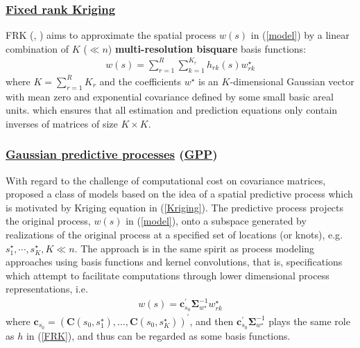 \documentclass[
12pt, %
a4paper, %
oneside, %
headinclude,footinclude, %
BCOR5mm, %
]{scrartcl}
\begin{document}
\subsubsection{\href{https://chenyw68.github.io/Literature/[2017]An R Package for Spatial and Spatio-Temporal Prediction with Large Datasets(FRK).pdf}{Fixed rank Kriging}}
FRK (\href{https://chenyw68.github.io/Literature/[2006]Spatial prediction for massive datasets.pdf}{\citep{cressie2006spatial}}, \href{https://chenyw68.github.io/Literature/[2008]Fixed rank kriging for very large spatial data sets.pdf}{\citep{cressie2008fixed}}) aims to approximate the spatial process $w(s)$ in (\ref{model}) by a linear combination of $K$ ($\ll n$) \textbf{multi-resolution bisquare} basis functions: \begin{equation}
\begin{aligned}
w(s) = \sum_{r = 1}^{R}\sum_{k = 1}^{K_r}h_{rk}(s)w_{rk}^{\star}
\end{aligned} \label{FRK}
\end{equation}
where $K = \sum_{r = 1}^{R}K_r$ and the coefficients $w^{\star}$ is an $K$-dimensional Gaussian vector with mean zero and exponential covariance  defined by some small basic areal units.
which ensures that all estimation and prediction equations only contain inverses of matrices of size $K \times K$.

\subsubsection{\href{https://chenyw68.github.io/Literature/[2015]spBayes for Large Spatio-Temporal Data Models.pdf}{Gaussian predictive processes} (\href{https://chenyw68.github.io/Literature/[2020]Bayesian spatially varying coefficient models in the spBayes R package.pdf}{GPP})}
With regard to the challenge of computational cost on covariance matrices, \href{https://chenyw68.github.io/Literature/[2008]Gaussian predictive process models for large spatial data sets.pdf}{\citet{banerjee2008gaussian}} proposed a class of models based on the idea of a spatial predictive process which is motivated by Kriging equation in (\ref{Kriging}). The predictive process projects the original process, $w(s)$ in (\ref{model}), onto a subspace generated by realizations of the original process at a specified set of locations (or knots), e.g. $s_1^{\star}, \cdots, s_K^{\star}, K \ll n$. The approach is in the same spirit as process modeling approaches using basis functions and kernel convolutions, that is, specifications which attempt to facilitate computations through lower dimensional process representations, i.e.
\begin{equation}
\begin{aligned}
w(s) = \boldsymbol{c}_{s_0}^\prime\boldsymbol{\Sigma}_{w^{\star}}^{-1}w_{rk}^{\star}
\end{aligned} \label{GPP}
\end{equation}
where $\boldsymbol{c}_{s_0} = \left(\boldsymbol{C}(s_0, s_1^{\star}), \dots, \boldsymbol{C}(s_0, s_K^{\star})\right)^\prime$, and then $\boldsymbol{c}_{s_0}^\prime\boldsymbol{\Sigma}_{w^{\star}}^{-1}$ plays the same role as $h$ in (\ref{FRK}), and thus can be regarded as some basis functions.
\end{document}
